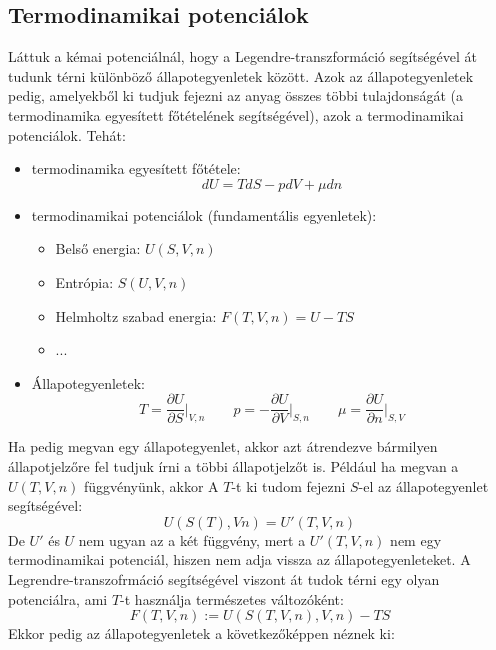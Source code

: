 \documentclass[a4paper,12pt]{article}
\begin{document}
\subsection{Termodinamikai potenciálok}
Láttuk a kémai potenciálnál, hogy a Legendre-transzformáció segítségével át tudunk térni különböző állapotegyenletek között. Azok az állapotegyenletek pedig,
amelyekből ki tudjuk fejezni az anyag összes többi tulajdonságát (a termodinamika egyesített főtételének segítségével), azok a termodinamikai potenciálok. Tehát:
\begin{itemize}
    \item termodinamika egyesített főtétele:
    \begin{equation}
        dU = T dS - p dV + \mu dn
    \end{equation}
    \item termodinamikai potenciálok (fundamentális egyenletek):
    \begin{itemize}
        \item Belső energia: $U(S, V, n)$
        \item Entrópia: $S(U, V, n)$
        \item Helmholtz szabad energia: $F(T, V, n) = U - T S$
        \item ...
    \end{itemize}
    \item Állapotegyenletek:
    \begin{equation}
        T = \frac{\partial U}{\partial S}\bigg|_{V,n} \qquad p = - \frac{\partial U}{\partial V}\bigg|_{S,n} \qquad \mu = \frac{\partial U}{\partial n}\bigg|_{S,V}
    \end{equation}
\end{itemize}
Ha pedig megvan egy állapotegyenlet, akkor azt átrendezve bármilyen állapotjelzőre fel tudjuk írni a többi állapotjelzőt is. Például ha megvan a $U(T,V,n)$ függvényünk, akkor
A $T$-t ki tudom fejezni $S$-el az állapotegyenlet segítségével:
\begin{equation}
    U(S(T), V n) = U'(T, V, n)
\end{equation}
De $U'$ és $U$ nem ugyan az a két függvény, mert a $U'(T, V, n)$ nem egy termodinamikai potenciál, hiszen nem adja vissza az állapotegyenleteket. 
A Legrendre-transzofrmáció segítségével viszont át tudok térni egy olyan potenciálra, ami $T$-t használja természetes változóként:
\begin{equation}
    F(T, V, n) := U(S(T, V, n), V, n) - T S
\end{equation}
Ekkor pedig az állapotegyenletek a következőképpen néznek ki:
\end{document}
